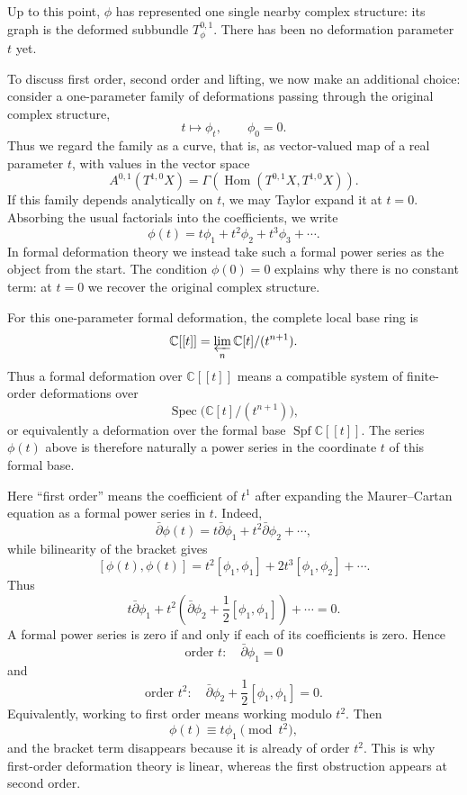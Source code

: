 Up to this point, $\phi$ has represented one single
nearby complex structure: its graph is the deformed
subbundle $T^{0,1}_\phi$. There has been no deformation
parameter $t$ yet.

To discuss first order, second order and lifting, we now
make an additional choice: consider a one-parameter family
of deformations passing through the original complex
structure,
$$
t\longmapsto \phi_t,
\qquad
\phi_0=0.
$$
Thus we regard the family as a curve,
that is, as vector-valued
map of a real parameter $t$,
with values in the
vector space
$$
A^{0,1}(T^{1,0}X)
=\Gamma\!\left(\operatorname{Hom}
(T^{0,1}X,T^{1,0}X)\right).
$$
If this family depends analytically on $t$, we may Taylor
expand it at $t=0$. Absorbing the usual factorials into the
coefficients, we write
$$
\phi(t)=t\phi_1+t^2\phi_2+t^3\phi_3+\cdots.
$$
In formal deformation theory we instead take such a formal
power series as the object from the start. The condition
$\phi(0)=0$ explains why there is no constant term: at
$t=0$ we recover the original complex structure.

For this one-parameter formal deformation, the complete
local base ring is
$$
\mathbb C[[t]]
=\varprojlim_n \mathbb C[t]/(t^{n+1}).
$$
Thus a formal deformation over $\mathbb C[[t]]$ means a
compatible system of finite-order deformations over
$$
\operatorname{Spec}\big(\mathbb C[t]/(t^{n+1})\big),
$$
or equivalently a deformation over the formal base
$\operatorname{Spf}\mathbb C[[t]]$. The series $\phi(t)$
above is therefore naturally a power series in the
coordinate $t$ of this formal base.

Here ``first order'' means the coefficient of $t^1$ after
expanding the Maurer--Cartan equation as a formal power
series in $t$. Indeed,
$$
\bar\partial\phi(t)
=t\bar\partial\phi_1+t^2\bar\partial\phi_2+\cdots,
$$
while bilinearity of the bracket gives
$$
[\phi(t),\phi(t)]
=t^2[\phi_1,\phi_1]
+2t^3[\phi_1,\phi_2]+\cdots.
$$
Thus
$$
t\bar\partial\phi_1
+t^2\left(
\bar\partial\phi_2+\frac12[\phi_1,\phi_1]
\right)
+\cdots=0.
$$
A formal power series is zero if and only if each of its
coefficients is zero. Hence
$$
\boxed{\text{order }t:\quad \bar\partial\phi_1=0}
$$
and
$$
\boxed{
\text{order }t^2:\quad
\bar\partial\phi_2+\frac12[\phi_1,\phi_1]=0.
}
$$
Equivalently, working to first order means working modulo
$t^2$. Then
$$
\phi(t)\equiv t\phi_1\pmod{t^2},
$$
and the bracket term disappears because it is already of
order $t^2$. This is why first-order deformation theory is
linear, whereas the first obstruction appears at second
order.

